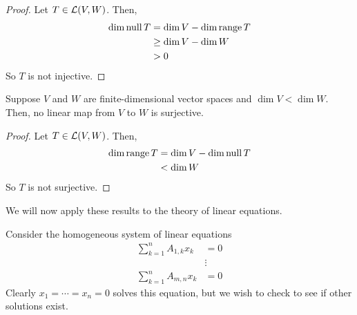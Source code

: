 \begin{proof}
    Let $T \in \mathcal{L}(V,W)$. Then,
    \begin{align*}
        \dim \operatorname{null} T &= \dim V - \dim \operatorname{range} T \\
        &\ge  \dim V -\dim W \\
        &> 0
    \end{align*}
    So $T$ is not injective.
\end{proof}
\begin{theorem}
    Suppose $V$ and $W$ are finite-dimensional vector spaces and $\dim V < \dim W$. Then, no linear map from $V$ to $W$ is surjective.
\end{theorem}
\begin{proof}
    Let $T\in \mathcal{L}(V,W)$. Then,
    \begin{align*}
        \dim \operatorname{range} T &= \dim V - \dim \operatorname{null} T \\
        &< \dim W
    \end{align*}
    So $T$ is not surjective.
\end{proof}
We will now apply these results to the theory of linear equations. 

Consider the homogeneous system of linear equations
\begin{align*}
    \sum_{k=1}^n A_{1,k}x_k &= 0 \\
    &\vdots \\
    \sum_{k=1}^n A_{m,n}x_k &= 0
\end{align*}
Clearly $x_1 = \cdots = x_n = 0$ solves this equation, but we wish to check to see if other solutions exist. 

